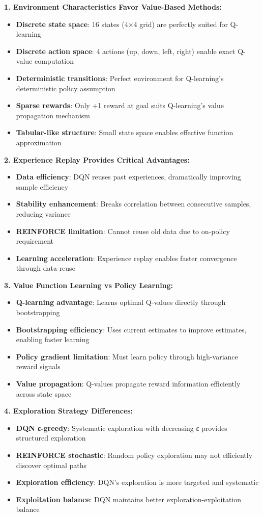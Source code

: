 \documentclass[12pt]{article}
\begin{document}
{{{\textbf{1. Environment Characteristics Favor Value-Based Methods:}
\begin{itemize}
    \item \textbf{Discrete state space}: 16 states (4×4 grid) are perfectly suited for Q-learning
    \item \textbf{Discrete action space}: 4 actions (up, down, left, right) enable exact Q-value computation
    \item \textbf{Deterministic transitions}: Perfect environment for Q-learning's deterministic policy assumption
    \item \textbf{Sparse rewards}: Only +1 reward at goal suits Q-learning's value propagation mechanism
    \item \textbf{Tabular-like structure}: Small state space enables effective function approximation
\end{itemize}

\textbf{2. Experience Replay Provides Critical Advantages:}
\begin{itemize}
    \item \textbf{Data efficiency}: DQN reuses past experiences, dramatically improving sample efficiency
    \item \textbf{Stability enhancement}: Breaks correlation between consecutive samples, reducing variance
    \item \textbf{REINFORCE limitation}: Cannot reuse old data due to on-policy requirement
    \item \textbf{Learning acceleration}: Experience replay enables faster convergence through data reuse
\end{itemize}

\textbf{3. Value Function Learning vs Policy Learning:}
\begin{itemize}
    \item \textbf{Q-learning advantage}: Learns optimal Q-values directly through bootstrapping
    \item \textbf{Bootstrapping efficiency}: Uses current estimates to improve estimates, enabling faster learning
    \item \textbf{Policy gradient limitation}: Must learn policy through high-variance reward signals
    \item \textbf{Value propagation}: Q-values propagate reward information efficiently across state space
\end{itemize}

\textbf{4. Exploration Strategy Differences:}
\begin{itemize}
    \item \textbf{DQN ε-greedy}: Systematic exploration with decreasing ε provides structured exploration
    \item \textbf{REINFORCE stochastic}: Random policy exploration may not efficiently discover optimal paths
    \item \textbf{Exploration efficiency}: DQN's exploration is more targeted and systematic
    \item \textbf{Exploitation balance}: DQN maintains better exploration-exploitation balance
\end{itemize}

}}}
\end{document}
